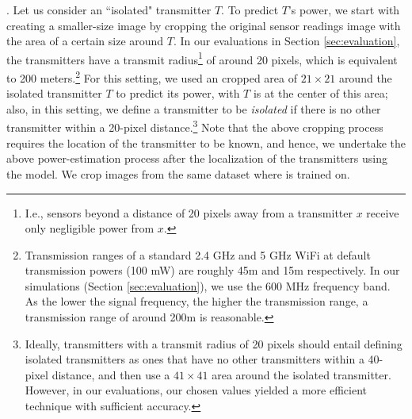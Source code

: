 . 
Let us consider an ``isolated" transmitter $T$. 
To predict $T$'s power, we start with
creating a smaller-size image by cropping the original sensor readings image with the area of a certain size around $T$. 
In our evaluations in Section \ref{sec:evaluation}, the transmitters have a transmit radius\footnote{I.e., sensors beyond a distance of 20 pixels away from a transmitter $x$ receive only negligible power from $x$.}
of around 20 pixels, which is equivalent to 200 meters.\footnote{Transmission ranges of a standard 2.4 GHz and 5 GHz WiFi at default transmission powers (100 mW) are roughly 45m and 15m respectively. 
In our simulations (Section \ref{sec:evaluation}), we use the 600 MHz frequency band. 
As the lower the signal frequency, the higher the transmission range, a transmission range of around 200m is reasonable.}
For this setting, we used an cropped area of $21 \times 21$ around the isolated transmitter $T$ to predict its power, with $T$ is at the center of this area; also, in this setting, we define a transmitter to be {\em isolated} if there is no other transmitter within a 20-pixel 
distance.\footnote{Ideally, transmitters with a transmit radius of 20 pixels should entail defining isolated transmitters as ones that have no other transmitters within a 40-pixel distance, and then use a
$41\times41$ area around the isolated transmitter. However, in our evaluations, our chosen values yielded a more efficient technique with sufficient accuracy.}
Note that the above cropping process requires the location of the transmitter to be known, and hence, we undertake the above power-estimation process after the localization of the transmitters using the \our model.  
We crop images from the same dataset where \our is trained on.

